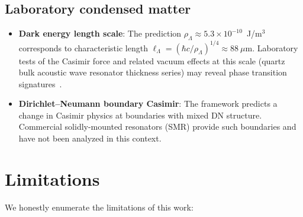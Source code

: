 \documentclass[11pt,a4paper]{article}
\begin{document}
\subsection{Laboratory condensed matter}

\begin{itemize}
\item \textbf{Dark energy length scale}: The prediction
$\rho_\Lambda \approx 5.3 \times 10^{-10}$~J/m$^3$ corresponds to
characteristic length $\ell_\Lambda = (\hbar c/\rho_\Lambda)^{1/4}
\approx 88~\mu$m. Laboratory tests of the Casimir force and related
vacuum effects at this scale (quartz bulk acoustic wave resonator
thickness series) may reveal phase transition signatures~\cite{wb-bawguide}.

\item \textbf{Dirichlet--Neumann boundary Casimir}: The framework
predicts a change in Casimir physics at boundaries with mixed DN
structure. Commercial solidly-mounted resonators (SMR) provide
such boundaries and have not been analyzed in this context.
\end{itemize}

\section{Limitations}
\label{sec:limitations}

We honestly enumerate the limitations of this work:
\end{document}
